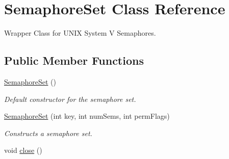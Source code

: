 \hypertarget{classSemaphoreSet}{\section{Semaphore\-Set Class Reference}
\label{classSemaphoreSet}
}


Wrapper Class for U\-N\-I\-X System V Semaphores.  


\subsection*{Public Member Functions}
\begin{DoxyCompactItemize}
\item 
\hypertarget{classSemaphoreSet_a91bfe49df662dc06f43dfe9149470fae}{\hyperlink{classSemaphoreSet_a91bfe49df662dc06f43dfe9149470fae}{Semaphore\-Set} ()}\label{classSemaphoreSet_a91bfe49df662dc06f43dfe9149470fae}

\begin{DoxyCompactList}\small\item\em Default constructor for the semaphore set. \end{DoxyCompactList}\item 
\hyperlink{classSemaphoreSet_a11f8c507a74d0d4295f2f9a83943f07a}{Semaphore\-Set} (int key, int num\-Sems, int perm\-Flags)
\begin{DoxyCompactList}\small\item\em Constructs a semaphore set. \end{DoxyCompactList}\item 
\hypertarget{classSemaphoreSet_a8746a1881e8b356db387325e12716116}{void \hyperlink{classSemaphoreSet_a8746a1881e8b356db387325e12716116}{close} ()}\label{classSemaphoreSet_a8746a1881e8b356db387325e12716116}


\end{DoxyCompactItemize}
